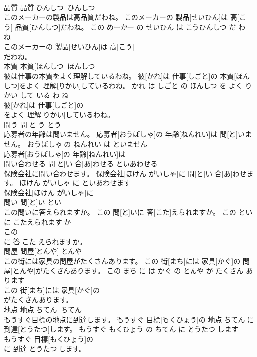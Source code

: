 \documentclass[8pt]{extreport}
\begin{document}
\begin{CJK}{UTF8}{min}
\\	品質	品質[ひんしつ]	ひんしつ	
\\	このメーカーの製品は高品質だわね。	このメーカーの 製品[せいひん]は 高[こう] 品質[ひんしつ]だわね。	この めーかー の せいひん は こうひんしつ だ わ ね	
\\	このメーカーの 製品[せいひん]は 高[こう]
\\	だわね。			
\\	本質	本質[ほんしつ]	ほんしつ	
\\	彼は仕事の本質をよく理解しているわね。	彼[かれ]は 仕事[しごと]の 本質[ほんしつ]をよく 理解[りかい]しているわね。	かれ は しごと の ほんしつ を よく りかい して いる わ ね	
\\	彼[かれ]は 仕事[しごと]の
\\	をよく 理解[りかい]しているわね。			
\\	問う	問[と]う	とう	
\\	応募者の年齢は問いません。	応募者[おうぼしゃ]の 年齢[ねんれい]は 問[と]いません。	おうぼしゃ の ねんれい は といません	
\\	応募者[おうぼしゃ]の 年齢[ねんれい]は
\\	問い合わせる	問[と]い 合[あ]わせる	といあわせる	
\\	保険会社に問い合わせます。	保険会社[ほけん がいしゃ]に 問[と]い 合[あ]わせます。	ほけん がいしゃ に といあわせます	
\\	保険会社[ほけん がいしゃ]に
\\	問い	問[と]い	とい	
\\	この問いに答えられますか。	この 問[と]いに 答[こた]えられますか。	この とい に こたえられます か	
\\	この
\\	に 答[こた]えられますか。			
\\	問屋	問屋[とんや]	とんや	
\\	この街には家具の問屋がたくさんあります。	この 街[まち]には 家具[かぐ]の 問屋[とんや]がたくさんあります。	この まち に は かぐ の とんや が たくさん あります	
\\	この 街[まち]には 家具[かぐ]の
\\	がたくさんあります。			
\\	地点	地点[ちてん]	ちてん	
\\	もうすぐ目標の地点に到達します。	もうすぐ 目標[もくひょう]の 地点[ちてん]に 到達[とうたつ]します。	もうすぐ もくひょう の ちてん に とうたつ します	
\\	もうすぐ 目標[もくひょう]の
\\	に 到達[とうたつ]します。			

\end{CJK}
\end{document}
